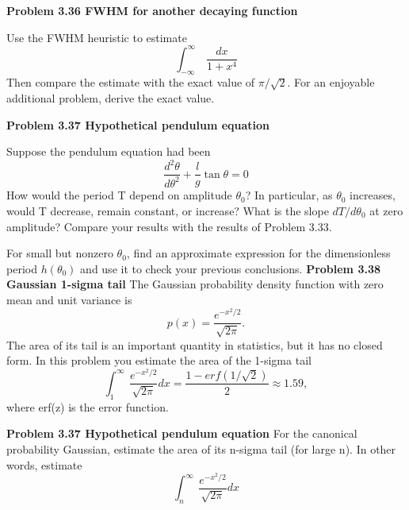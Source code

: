 \documentclass[a4paper, 11pt]{book}
\begin{document}
\colorbox{light-gray}{
\begin{minipage}{\textwidth}
\large\textbf{Problem 3.36 FWHM for another decaying function} 

Use the FWHM heuristic to estimate
\begin{equation}\int_{-\infty}^\infty\ \frac{dx}{1+x^4}\end{equation}
Then compare the estimate with the exact value of $\pi/\sqrt{2}$. For an enjoyable
additional problem, derive the exact value.

\large\textbf{Problem 3.37 Hypothetical pendulum equation} 

Suppose the pendulum equation had been
\begin{equation}\frac{d^2\theta}{d\theta^2} + \frac{l}{g}\tan \theta=0\end{equation}
How would the period T depend on amplitude $\theta_{0}$? In particular, as $\theta_{0}$ increases,
would T decrease, remain constant, or increase? What is the slope $dT/d\theta_{0}$ at
zero amplitude? Compare your results with the results of Problem 3.33.

For small but nonzero $\theta_{0}$, find an approximate expression for the dimensionless
period $h(\theta_{0})$ and use it to check your previous conclusions.
\large\textbf{Problem 3.38 Gaussian 1-sigma tail} 
The Gaussian probability density function with zero mean and unit variance is
\begin{equation}p(x)=\frac{e^{-x^2/2}}{\sqrt{2\pi}}.\end{equation}
The area of its tail is an important quantity in statistics, but it has no closed form.
In this problem you estimate the area of the 1-sigma tail
\begin{equation}\int_{1}^\infty\ \frac{e^{-x^2/2}}{\sqrt{2\pi}}dx=\frac{1-erf(1/\sqrt{2})}{2}\approx 1.59,\end{equation}
where erf(z) is the error function.

\large\textbf{Problem 3.37 Hypothetical pendulum equation} 
For the canonical probability Gaussian, estimate the area of its n-sigma tail (for
large n). In other words, estimate
\begin{equation}\int_{n}^\infty\ \frac{e^{-x^2/2}}{\sqrt{2\pi}} dx\end{equation}
\end{minipage}
}
\end{document}
